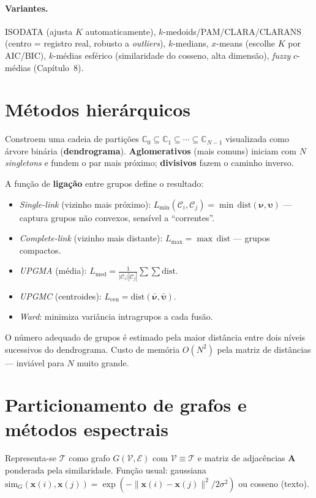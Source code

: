\paragraph{Variantes.} ISODATA (ajusta $K$ automaticamente),
$k$-medoids/PAM/CLARA/CLARANS (centro = registro real, robusto a
\emph{outliers}), $k$-medians, $x$-means (escolhe $K$ por AIC/BIC),
$k$-médias esférico (similaridade do cosseno, alta dimensão), \emph{fuzzy}
$c$-médias (Capítulo~8).

\section{Métodos hierárquicos}

Constroem uma cadeia de partições
$\mathbb{C}_0\subseteq\mathbb{C}_1\subseteq\cdots\subseteq\mathbb{C}_{N-1}$
visualizada como árvore binária (\textbf{dendrograma}).
\textbf{Aglomerativos} (mais comuns) iniciam com $N$ \emph{singletons} e
fundem o par mais próximo; \textbf{divisivos} fazem o caminho inverso.

A função de \textbf{ligação} entre grupos define o resultado:
\begin{itemize}[leftmargin=1.2cm]
  \item \emph{Single-link} (vizinho mais próximo): $L_{\min}(\mathcal{C}_i,\mathcal{C}_j)=\min\,\mathrm{dist}(\boldsymbol\nu,\boldsymbol\upsilon)$ --- captura grupos não convexos, sensível a ``correntes''.
  \item \emph{Complete-link} (vizinho mais distante): $L_{\max}=\max\,\mathrm{dist}$ --- grupos compactos.
  \item \emph{UPGMA} (média): $L_{\mathrm{med}}=\frac{1}{|\mathcal{C}_i||\mathcal{C}_j|}\sum\sum\mathrm{dist}$.
  \item \emph{UPGMC} (centroides): $L_{\mathrm{cen}}=\mathrm{dist}(\bar{\boldsymbol\nu},\bar{\boldsymbol\upsilon})$.
  \item \emph{Ward}: minimiza variância intragrupos a cada fusão.
\end{itemize}
O número adequado de grupos é estimado pela maior distância entre dois
níveis sucessivos do dendrograma. Custo de memória $O(N^2)$ pela
matriz de distâncias --- inviável para $N$ muito grande.

\section{Particionamento de grafos e métodos espectrais}

Representa-se $\mathcal{T}$ como grafo $G(\mathcal{V},\mathcal{E})$
com $\mathcal{V}\equiv\mathcal{T}$ e matriz de adjacências
$\mathbf{A}$ ponderada pela similaridade. Função usual: gaussiana
$\mathrm{sim}_G(\mathbf{x}(i),\mathbf{x}(j))=\exp(-\|\mathbf{x}(i)-\mathbf{x}(j)\|^2/2\sigma^2)$
ou cosseno (texto).


